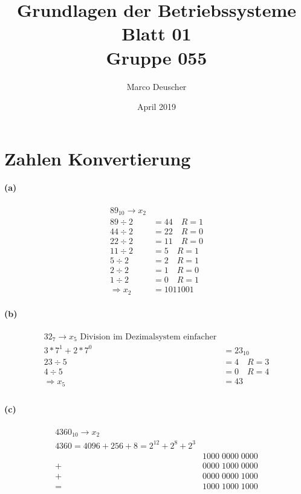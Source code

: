 \documentclass[a4paper]{article}
\title{Grundlagen der Betriebssysteme\\ Blatt 01 \\ Gruppe 055}
\author{Marco Deuscher}
\date{April 2019}
\begin{document}
\maketitle

\section{Zahlen Konvertierung}
\paragraph{(a)}
\begin{align*}
    89_{10} \rightarrow x_2\\
    89\div2 &= 44 \quad R=1\\
    44\div2&=22 \quad R=0\\
    22\div2&=11 \quad R=0\\
    11\div2&=5 \quad R=1\\
    5\div2&=2 \quad R=1\\
    2\div2&=1 \quad R=0\\
    1\div2&=0 \quad R=1\\
    \Rightarrow x_2&=1011001
\end{align*}

\paragraph{(b)}
\begin{align*}
    32_7 \rightarrow x_5\text{ Division im Dezimalsystem einfacher}\\
    3*7^1+2*7^0&=23_{10}\\
    23\div5&=4\quad R=3\\
    4\div5&=0\quad R=4\\
    \Rightarrow x_5&=43\\
\end{align*}

\paragraph{(c)}
\begin{align*}
    4360_{10}\rightarrow x_2\\
    4360=4096+256+8=2^{12}+2^8+2^3\\
    &1000\;0000\;0000\\
    +&0000\;1000\;0000\\
    +&0000\;0000\;1000\\
    =&1000\;1000\;1000\\
\end{align*}
\end{document}
